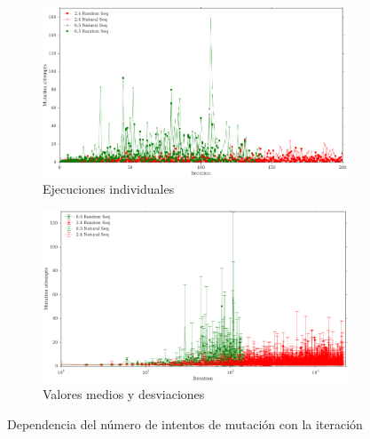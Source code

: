 \begin{figure}[htbp]
\advance\leftskip-1.5cm
  \begin{subfigure}[b]{\textwidth}
    \includegraphics[width=1.15\textwidth]{img/resultados/individuales-mutAt-vs-iter-hasta200.png}
    \caption{Ejecuciones individuales}
    \label{fig:mutAttemptsVsite-a}
  \end{subfigure}
  \begin{subfigure}[b]{\textwidth}
    \includegraphics[width=1.15\textwidth]{img/resultados/mutAttemptsVsite-cada1-hasta2270.png}
    \caption{Valores medios y desviaciones}
  \label{fig:mutAttemptsVsite-b}
  \end{subfigure}
  \caption{Dependencia del número de intentos de mutación con la iteración}
  \label{fig:mutAttemptsVsite}
\end{figure}

